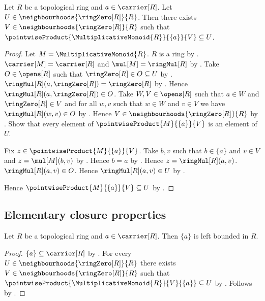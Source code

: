 \begin{lemma}\label{topological_ring_left_multiplication_zero_neighbourhood}
    Let $R$ be a topological ring and $a\in\carrier[R]$.
    Let $U\in\neighbourhoods{\ringZero[R]}{R}$.
    Then there exists $V\in\neighbourhoods{\ringZero[R]}{R}$ such that
        $\pointwiseProduct{\MultiplicativeMonoid{R}}{\{a\}}{V}\subseteq U$.
\end{lemma}
\begin{proof}
    Let $M=\MultiplicativeMonoid{R}$.
    $R$ is a ring by .
    $\carrier[M]=\carrier[R]$ and $\mul[M]=\ringMul[R]$ by
        .
    Take $O\in\opens[R]$ such that
        $\ringZero[R]\in O\subseteq U$ by .
    $\ringMul[R](a,\ringZero[R])=\ringZero[R]$ by
        .
    Hence $\ringMul[R](a,\ringZero[R])\in O$.
    Take $W,V\in\opens[R]$ such that
        $a\in W$ and $\ringZero[R]\in V$ and
        for all $w,v$ such that $w\in W$ and $v\in V$ we have
            $\ringMul[R](w,v)\in O$ by
        .
    Hence $V\in\neighbourhoods{\ringZero[R]}{R}$ by
        .
    Show that every element of $\pointwiseProduct{M}{\{a\}}{V}$ is an
        element of $U$.
    \begin{subproof}
        Fix $z\in\pointwiseProduct{M}{\{a\}}{V}$.
        Take $b,v$ such that $b\in\{a\}$ and $v\in V$ and
            $z=\mul[M](b,v)$ by .
        Hence $b=a$ by .
        Hence $z=\ringMul[R](a,v)$.
        $\ringMul[R](a,v)\in O$.
        Hence $\ringMul[R](a,v)\in U$ by .
    \end{subproof}
    Hence $\pointwiseProduct{M}{\{a\}}{V}\subseteq U$ by .
\end{proof}

\subsection{Elementary closure properties}

\begin{proposition}\label{left_bounded_singleton}
    Let $R$ be a topological ring and $a\in\carrier[R]$.
    Then $\{a\}$ is left bounded in $R$.
\end{proposition}
\begin{proof}
    $\{a\}\subseteq\carrier[R]$ by .
    For every $U\in\neighbourhoods{\ringZero[R]}{R}$ there exists
        $V\in\neighbourhoods{\ringZero[R]}{R}$ such that
        $\pointwiseProduct{\MultiplicativeMonoid{R}}{V}{\{a\}}\subseteq U$
        by .
    Follows by .
\end{proof}

